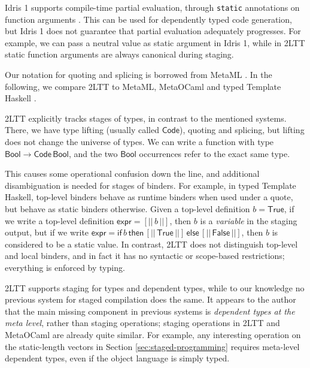\documentclass[acmsmall,screen]{acmart}
\newcommand{\msf}[1]{\mathsf{#1}}
\newcommand{\Bool}{\msf{Bool}}
\newcommand{\True}{\msf{True}}
\newcommand{\False}{\msf{False}}
\theoremstyle{remark}
\begin{document}

Idris 1 supports compile-time partial evaluation, through \texttt{static}
annotations on function arguments \cite{scrap-your-inefficient-engine}. This can
be used for dependently typed code generation, but Idris 1 does not guarantee
that partial evaluation adequately progresses. For example, we can pass a neutral
value as static argument in Idris 1, while in 2LTT static function arguments
are always canonical during staging.

Our notation for quoting and splicing is borrowed from MetaML \cite{metaml}.  In
the following, we compare 2LTT to MetaML, MetaOCaml \cite{kiselyov14metaocaml}
and typed Template Haskell \cite{typed-th}.

2LTT explicitly tracks stages of types, in contrast to the mentioned
systems. There, we have type lifting (usually called $\msf{Code}$), quoting and
splicing, but lifting does not change the universe of types. We can write a
function with type $\Bool \to \msf{Code}\,\Bool$, and the two $\Bool$
occurrences refer to the exact same type.

This causes some operational confusion down the line, and additional
disambiguation is needed for stages of binders. For example, in typed Template
Haskell, top-level binders behave as runtime binders when used under a quote,
but behave as static binders otherwise. Given a top-level definition $b =
\True$, if we write a top-level definition $\msf{expr} = [||\,b\,||]$, then $b$
is a \emph{variable} in the staging output, but if we write $\msf{expr} =
\msf{if}\,b\,\msf{then}\,[||\,\True\,||]\,\msf{else}\,[||\,\False\,||]$, then
$b$ is considered to be a static value. In contrast, 2LTT does not distinguish
top-level and local binders, and in fact it has no syntactic or scope-based
restrictions; everything is enforced by typing.

2LTT supports staging for types and dependent types, while to our knowledge no
previous system for staged compilation does the same. It appears to the author
that the main missing component in previous systems is \emph{dependent types at
the meta level}, rather than staging operations; staging operations in 2LTT and
MetaOCaml are already quite similar. For example, any interesting operation on
the static-length vectors in Section \ref{sec:staged-programming} requires
meta-level dependent types, even if the object language is simply typed.
\end{document}
